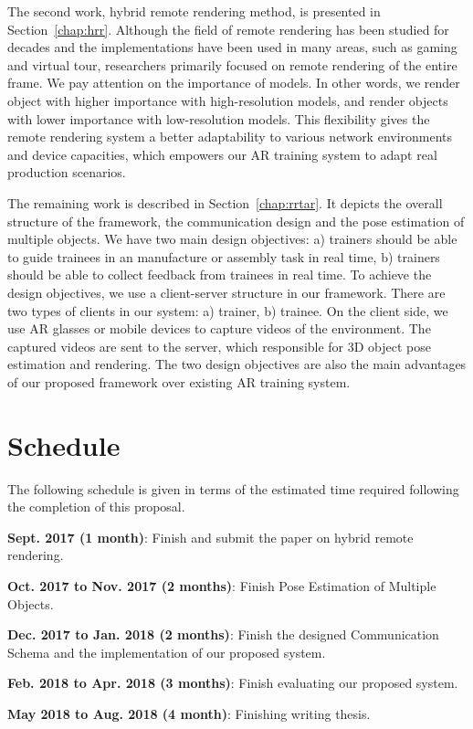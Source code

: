 The second work, hybrid remote rendering method, is presented in Section~\ref{chap:hrr}.
Although the field of remote rendering has been studied for decades and the implementations have been used in many areas, such as gaming and virtual tour, researchers primarily focused on remote rendering of the entire frame.
We pay attention on the importance of models. In other words, we render object with higher importance with high-resolution models, and render objects with lower importance with low-resolution models.
This flexibility gives the remote rendering system a better adaptability to various network environments and device capacities, which empowers our AR training system to adapt real production scenarios.

The remaining work is described in Section~\ref{chap:rrtar}.
It depicts the overall structure of the framework, the communication design and the pose estimation of multiple objects.
We have two main design objectives: a) trainers should be able to guide trainees in an manufacture or assembly task in real time, b) trainers should be able to collect feedback from trainees in real time.
To achieve the design objectives, we use a client-server structure in our framework.
There are two types of clients in our system: a) trainer, b) trainee. On the client side, we use AR glasses or mobile devices to capture videos of the environment.
The captured videos are sent to the server, which responsible for 3D object pose estimation and rendering.
The two design objectives are also the main advantages of our proposed framework over existing AR training system.

\section{Schedule}

The following schedule is given in terms of the estimated time required following the completion of this proposal.

\textbf{Sept. 2017 (1 month)}: Finish and submit the paper on hybrid remote rendering.

\textbf{Oct. 2017 to Nov. 2017 (2 months)}: Finish Pose Estimation of Multiple Objects.

\textbf{Dec. 2017 to Jan. 2018 (2 months)}: Finish the designed Communication Schema and the implementation of our proposed system.

\textbf{Feb. 2018 to Apr. 2018 (3 months)}: Finish evaluating our proposed system.

\textbf{May 2018 to Aug. 2018 (4 month)}: Finishing writing thesis.

